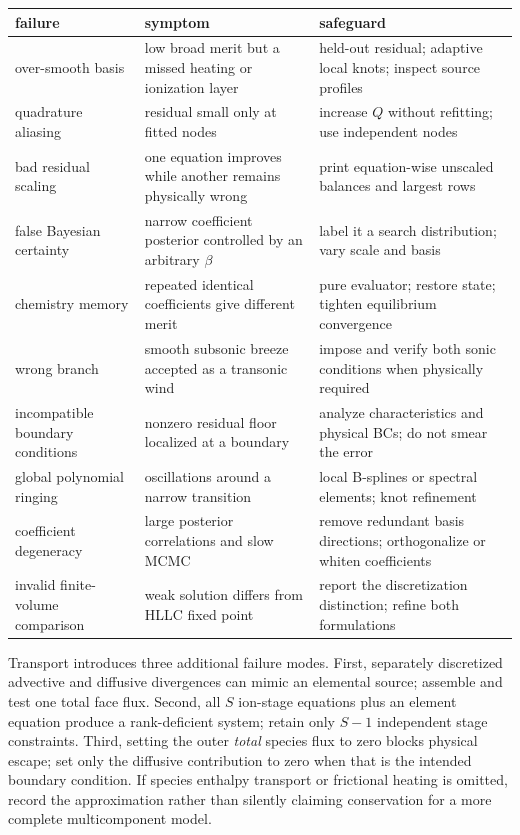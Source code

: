 \documentclass[english,a4paper]{my_memo}
\begin{document}
\begin{center}\small
\begin{tabular}{@{}p{}p{}p{}@{}}
\toprule
failure & symptom & safeguard \\
\midrule
over-smooth basis & low broad merit but a missed heating or ionization layer &
  held-out residual; adaptive local knots; inspect source profiles \\
quadrature aliasing & residual small only at fitted nodes & increase \(Q\)
  without refitting; use independent nodes \\
bad residual scaling & one equation improves while another remains physically
  wrong & print equation-wise unscaled balances and largest rows \\
false Bayesian certainty & narrow coefficient posterior controlled by an
  arbitrary \(\beta\) & label it a search distribution; vary scale and basis \\
chemistry memory & repeated identical coefficients give different merit & pure
  evaluator; restore state; tighten equilibrium convergence \\
wrong branch & smooth subsonic breeze accepted as a transonic wind & impose and
  verify both sonic conditions when physically required \\
incompatible boundary conditions & nonzero residual floor localized at a
  boundary & analyze characteristics and physical BCs; do not smear the error \\
global polynomial ringing & oscillations around a narrow transition & local
  B-splines or spectral elements; knot refinement \\
coefficient degeneracy & large posterior correlations and slow MCMC & remove
  redundant basis directions; orthogonalize or whiten coefficients \\
invalid finite-volume comparison & weak solution differs from HLLC fixed point &
  report the discretization distinction; refine both formulations \\
\bottomrule
\end{tabular}
\end{center}

Transport introduces three additional failure modes.  First, separately
discretized advective and diffusive divergences can mimic an elemental source;
assemble and test one total face flux.  Second, all \(S\) ion-stage equations
plus an element equation produce a rank-deficient system; retain only \(S-1\)
independent stage constraints.  Third, setting the outer \emph{total} species
flux to zero blocks physical escape; set only the diffusive contribution to zero
when that is the intended boundary condition.  If species enthalpy transport or
frictional heating is omitted, record the approximation rather than silently
claiming conservation for a more complete multicomponent model.
\end{document}
